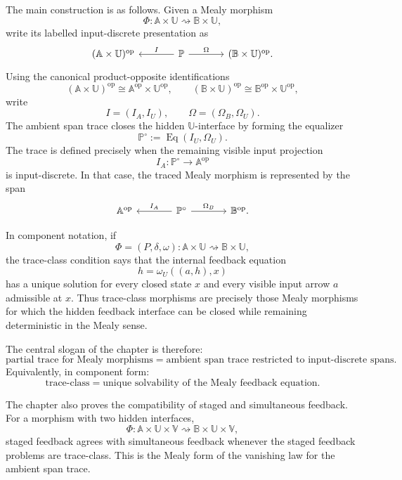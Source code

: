The main construction is as follows.  Given a Mealy morphism
\[
\Phi:\mathbb A\times\mathbb U
\rightsquigarrow
\mathbb B\times\mathbb U,
\]
write its labelled input-discrete presentation as
\[
\begin{tikzcd}[column sep=large]
(\mathbb A\times\mathbb U)^{\mathrm{op}}
&
\mathbb P
  \arrow[l, "I"']
  \arrow[r, "\Omega"]
&
(\mathbb B\times\mathbb U)^{\mathrm{op}} .
\end{tikzcd}
\]
Using the canonical product-opposite identifications
\[
(\mathbb A\times\mathbb U)^{\mathrm{op}}
\cong
\mathbb A^{\mathrm{op}}\times\mathbb U^{\mathrm{op}},
\qquad
(\mathbb B\times\mathbb U)^{\mathrm{op}}
\cong
\mathbb B^{\mathrm{op}}\times\mathbb U^{\mathrm{op}},
\]
write
\[
I=(I_A,I_U),
\qquad
\Omega=(\Omega_B,\Omega_U).
\]
The ambient span trace closes the hidden \(\mathbb U\)-interface by forming
the equalizer
\[
\mathbb P^\circ
:=
\operatorname{Eq}(I_U,\Omega_U).
\]
The trace is defined precisely when the remaining visible input projection
\[
I_A:\mathbb P^\circ\to\mathbb A^{\mathrm{op}}
\]
is input-discrete.  In that case, the traced Mealy morphism is represented by
the span
\[
\begin{tikzcd}[column sep=large]
\mathbb A^{\mathrm{op}}
&
\mathbb P^\circ
  \arrow[l, "I_A"']
  \arrow[r, "\Omega_B"]
&
\mathbb B^{\mathrm{op}} .
\end{tikzcd}
\]

In component notation, if
\[
\Phi=(P,\delta,\omega):
\mathbb A\times\mathbb U
\rightsquigarrow
\mathbb B\times\mathbb U,
\]
the trace-class condition says that the internal feedback equation
\[
h=\omega_U((a,h),x)
\]
has a unique solution for every closed state \(x\) and every visible input
arrow \(a\) admissible at \(x\).  Thus trace-class morphisms are precisely
those Mealy morphisms for which the hidden feedback interface can be closed
while remaining deterministic in the Mealy sense.

The central slogan of the chapter is therefore:
\[
\boxed{
\text{partial trace for Mealy morphisms}
=
\text{ambient span trace restricted to input-discrete spans}.
}
\]
Equivalently, in component form:
\[
\boxed{
\text{trace-class}
=
\text{unique solvability of the Mealy feedback equation}.
}
\]

The chapter also proves the compatibility of staged and simultaneous feedback.
For a morphism with two hidden interfaces,
\[
\Phi:
\mathbb A\times\mathbb U\times\mathbb V
\rightsquigarrow
\mathbb B\times\mathbb U\times\mathbb V,
\]
staged feedback agrees with simultaneous feedback whenever the staged feedback
problems are trace-class.  This is the Mealy form of the vanishing law for the
ambient span trace.

